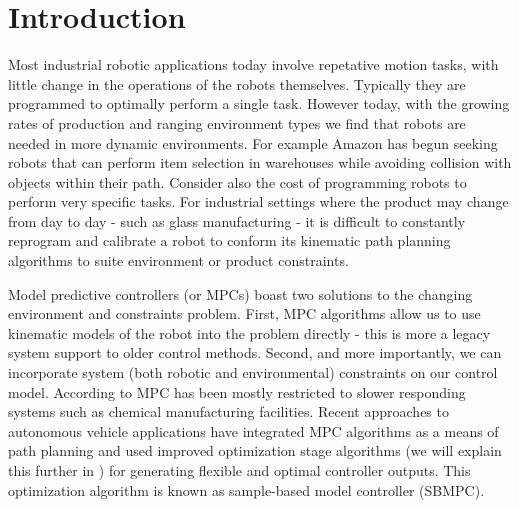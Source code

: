 \documentclass[main.tex]{subfile}
\begin{document}
\section{Introduction} 
\label{sec:introduction}

Most industrial robotic applications today involve repetative motion tasks, with
little change in the operations of the robots themselves. Typically they are
programmed to optimally perform a single task. However today, with the growing
rates of production and ranging environment types we find that robots are needed
in more dynamic environments. For example Amazon has begun seeking robots that
can perform item selection in warehouses \cite{amazon} while avoiding collision
with objects within their path.  Consider also the cost of programming robots to
perform very specific tasks. For industrial settings where the product may
change from day to day - such as glass manufacturing - it is difficult to
constantly reprogram and calibrate a robot to conform its kinematic path
planning algorithms to suite environment or product constraints. 

Model predictive controllers (or MPCs) boast two solutions to the changing
environment and constraints problem. First, MPC algorithms allow us to use
kinematic models of the robot into the problem directly - this is more a legacy
system support to older control methods. Second, and more importantly, we can
incorporate system (both robotic and environmental) constraints on our control
model. According to \cite{autoVehicle} MPC has been mostly restricted to slower
responding systems such as chemical manufacturing facilities. Recent approaches
to autonomous vehicle applications have integrated MPC algorithms as a means of
path planning \cite{auv,uphill} and used improved optimization stage algorithms
(we will explain this further in ) for generating flexible and
optimal controller outputs. This optimization algorithm is known as sample-based
model controller (SBMPC).

\end{document}
